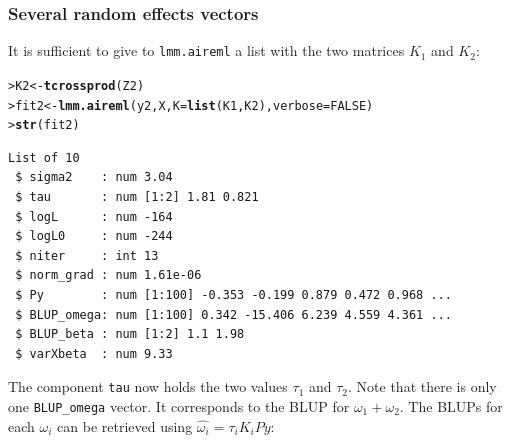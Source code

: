 \documentclass{article}\usepackage[]{graphicx}\usepackage[]{color}
\makeatletter
\newcommand{\hlnum}[1]{\textcolor[rgb]{0.686,0.059,0.569}{#1}}%
\newcommand{\hlstd}[1]{\textcolor[rgb]{0.345,0.345,0.345}{#1}}%
\newcommand{\hlkwb}[1]{\textcolor[rgb]{0.69,0.353,0.396}{#1}}%
\newcommand{\hlkwc}[1]{\textcolor[rgb]{0.333,0.667,0.333}{#1}}%
\newcommand{\hlkwd}[1]{\textcolor[rgb]{0.737,0.353,0.396}{\textbf{#1}}}%
\newenvironment{kframe}{%
 \def\at@end@of@kframe{}%
 \ifinner\ifhmode%
  \def\at@end@of@kframe{\end{minipage}}%
  \begin{minipage}{\columnwidth}%
 \fi\fi%
 \def\FrameCommand##1{\hskip\@totalleftmargin \hskip-\fboxsep
 \colorbox{shadecolor}{##1}\hskip-\fboxsep
     \hskip-\linewidth \hskip-\@totalleftmargin \hskip\columnwidth}%
 \MakeFramed {\advance\hsize-\width
   \@totalleftmargin\z@ \linewidth\hsize
   \@setminipage}}%
 {\par\unskip\endMakeFramed%
 \at@end@of@kframe}
\newenvironment{knitrout}{}{} %
\makeatother
\begin{document}
  \subsubsection{Several random effects vectors}

  It is sufficient to give to \verb!lmm.aireml! a list with the two matrices
  $K_1$ and $K_2$:

\begin{knitrout}
\color{fgcolor}\begin{kframe}
\begin{alltt}
\hlstd{> }\hlstd{K2} \hlkwb{<-} \hlkwd{tcrossprod}\hlstd{(Z2)}
\hlstd{> }\hlstd{fit2} \hlkwb{<-} \hlkwd{lmm.aireml}\hlstd{(y2, X,} \hlkwc{K} \hlstd{=} \hlkwd{list}\hlstd{(K1, K2),} \hlkwc{verbose} \hlstd{=} \hlnum{FALSE}\hlstd{)}
\hlstd{> }\hlkwd{str}\hlstd{(fit2)}
\end{alltt}
\begin{verbatim}
List of 10
 $ sigma2    : num 3.04
 $ tau       : num [1:2] 1.81 0.821
 $ logL      : num -164
 $ logL0     : num -244
 $ niter     : int 13
 $ norm_grad : num 1.61e-06
 $ Py        : num [1:100] -0.353 -0.199 0.879 0.472 0.968 ...
 $ BLUP_omega: num [1:100] 0.342 -15.406 6.239 4.559 4.361 ...
 $ BLUP_beta : num [1:2] 1.1 1.98
 $ varXbeta  : num 9.33
\end{verbatim}
\end{kframe}
\end{knitrout}

  The component \verb!tau! now holds the two values $\tau_1$ and $\tau_2$.
  Note that there is only one \verb!BLUP_omega! vector. It corresponds to
  the BLUP for $\omega_1 + \omega_2$. The BLUPs for each $\omega_i$ can
  be retrieved using $\widehat{\omega_i} = \tau_i K_i Py$:
\end{document}
